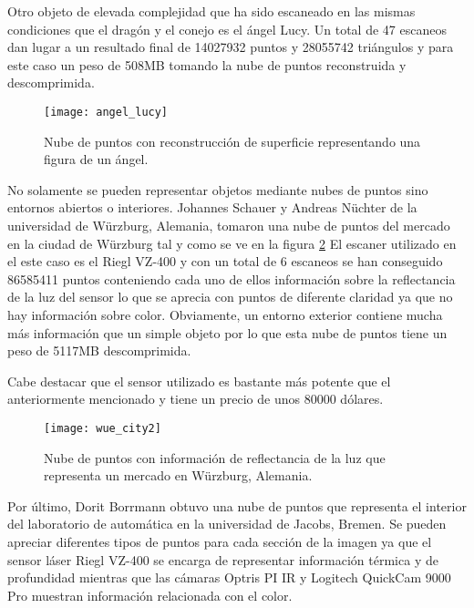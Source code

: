 Otro objeto de elevada complejidad que ha sido escaneado en las mismas condiciones que el dragón y el conejo es el ángel Lucy. Un total de 47 escaneos dan lugar a un resultado final de 14027932 puntos y 28055742 triángulos y para este caso un peso de 508MB tomando la nube de puntos reconstruida y descomprimida.

\begin{figure}
\centering
\texttt{[image: angel\_lucy]}
\caption{Nube de puntos con reconstrucción de superficie representando una figura de un ángel.}\label{fig:angel_lucy}
\end{figure}

No solamente se pueden representar objetos mediante nubes de puntos sino entornos abiertos o interiores. Johannes Schauer y Andreas Nüchter de la universidad de Würzburg, Alemania, tomaron una nube de puntos del mercado en la ciudad de Würzburg tal y como se ve en la figura \ref{fig:wue_city}
El escaner utilizado en el este caso es el Riegl VZ-400 y con un total de 6 escaneos se han conseguido 86585411 puntos conteniendo cada uno de ellos información sobre la reflectancia de la luz del sensor lo que se aprecia con puntos de diferente claridad ya que no hay información sobre color. Obviamente, un entorno exterior contiene mucha más información que un simple objeto por lo que esta nube de puntos tiene un peso de 5117MB descomprimida.

Cabe destacar que el sensor utilizado es bastante más potente que el anteriormente mencionado y tiene un precio de unos 80000 dólares.


\begin{figure}
\centering
\texttt{[image: wue\_city2]}
\caption{Nube de puntos con información de reflectancia de la luz que representa un mercado en Würzburg, Alemania.}\label{fig:wue_city}
\end{figure}

Por último, Dorit Borrmann obtuvo una nube de puntos que representa el interior del laboratorio de automática en la universidad de Jacobs, Bremen. Se pueden apreciar diferentes tipos de puntos para cada sección de la imagen ya que el sensor láser Riegl VZ-400 se encarga de representar información térmica y de profundidad mientras que las cámaras Optris PI IR y Logitech QuickCam 9000 Pro muestran información relacionada con el color.

